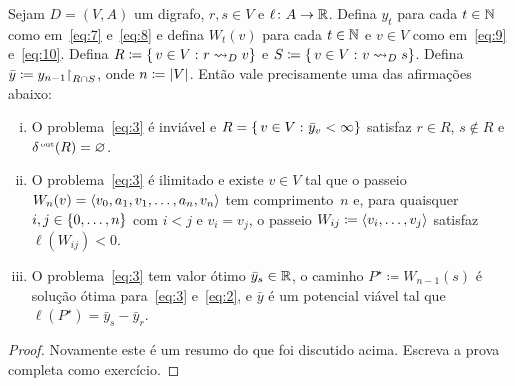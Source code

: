 \documentclass[10pt,reqno]{amsart}
\begin{document}
\begin{theorem}
  Sejam \(D = (V,A)\) um digrafo, \(r,s \in V\) e
  \(\ell \colon A \to \mathbb{R}\).  Defina \(y_t\) para cada
  \(t \in \mathbb{N}\) como em~\eqref{eq:7} e~\eqref{eq:8} e defina
  \(W_t(v)\) para cada \(t \in \mathbb{N}\) e \(v \in V\) como
  em~\eqref{eq:9} e~\eqref{eq:10}.  Defina
  \(R \coloneqq \{\,{v \in V}\,\colon{r \rightsquigarrow_D v}\}\) e
  \(S \coloneqq \{\,{v \in V}\,\colon{v \rightsquigarrow_D s}\}\).  Defina
  \(\bar{y} \coloneqq y_{n-1}\mathord{\restriction}_{R \cap S}\), onde
  \(n \coloneqq \lvert V\rvert\).  Então vale precisamente uma das
  afirmações abaixo:
  \begin{enumerate}[(i)]
  \item O problema~\eqref{eq:3} é inviável e
    \(R = \{\,{v \in V}\,\colon{\bar{y}_v < \infty}\}\) satisfaz \(r \in R\),
    \(s \not\in R\) e \(\delta_{}^{\scriptscriptstyle \rm\, out}(R) = \varnothing\).
  \item O problema~\eqref{eq:3} é ilimitado e existe \(v \in V\) tal
    que o passeio \(W_n(v) = \langle v_0,a_1,v_1,\dotsc,a_n,v_n\rangle\) tem
    comprimento~\(n\) e, para quaisquer \(i,j \in \{0,\dotsc,n\}\)
    com \(i < j\) e \(v_i = v_j\), o passeio
    \(W_{ij} \coloneqq \langle v_i,\dotsc,v_j\rangle\) satisfaz
    \(\ell(W_{ij}) < 0\).
  \item O problema~\eqref{eq:3} tem valor ótimo
    \(\bar{y}_s \in \mathbb{R}\), o caminho
    \(P^{\star} \coloneqq W_{n-1}(s)\) é solução ótima
    para~\eqref{eq:3} e~\eqref{eq:2}, e \(\bar{y}\) é um potencial
    viável tal que \(\ell(P^{\star}) = \bar{y}_s - \bar{y}_r\).
  \end{enumerate}
\end{theorem}
\begin{proof}
  Novamente este é um resumo do que foi discutido acima.  Escreva a
  prova completa como exercício.
\end{proof}

\nocite{CookCPS98a,Schrijver03a}

\begingroup
\printbibliography
\endgroup
\end{document}
